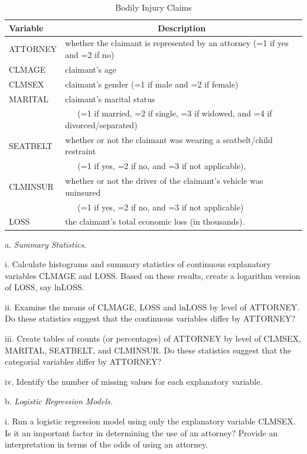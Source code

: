 \begin{exercises}
\begin{table}[h]
\caption{\label{Ex:IRCAttorney} \small Bodily Injury Claims}
\begin{center}
\begin{tabular}{l|l}
\hline
\bf Variable & \multicolumn{1}{c}{\bf Description} \\
\hline ATTORNEY & whether the claimant is represented by an attorney
(=1 if yes and =2 if no) \\
CLMAGE & claimant's age \\
CLMSEX & claimant's gender (=1
if male and =2 if female) \\
MARITAL & claimant's marital status \\
& ~~~(=1 if married, =2 if
single, =3 if widowed, and =4 if divorced/separated) \\
SEATBELT & whether or not the claimant was wearing a seatbelt/child
restraint \\
& ~~~(=1 if yes, =2 if no, and =3 if not applicable),\\
CLMINSUR &  whether or not the driver of the claimant's vehicle was
uninsured
\\
& ~~~(=1 if yes, =2 if no, and =3 if not
applicable) \\
LOSS & the claimant's total economic loss (in thousands). \\
\hline
\end{tabular}
\end{center}
\end{table}

a. \textit{Summary Statistics}.

i. Calculate histograms and summary statistics of continuous
explanatory variables CLMAGE and LOSS. Based on these results,
create a logarithm version of LOSS, say lnLOSS.

ii. Examine the means of CLMAGE, LOSS and lnLOSS by level of
ATTORNEY. Do these statistics suggest that the continuous variables
differ by ATTORNEY?

iii. Create tables of counts (or percentages) of ATTORNEY by level
of CLMSEX, MARITAL, SEATBELT, and CLMINSUR. Do these statistics
suggest that the categorial variables differ by ATTORNEY?

iv. Identify the number of missing values for each explanatory
variable.

b. \textit{Logistic Regression Models.}

i. Run a logistic regression model using only the explanatory
variable CLMSEX. Is it an important factor in determining the use of
an attorney? Provide an interpretation in terms of the odds of using
an attorney.


\end{exercises}
